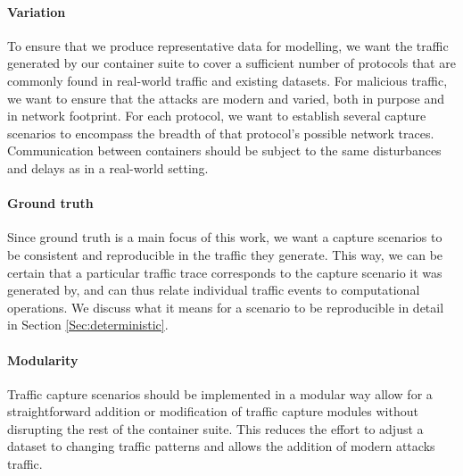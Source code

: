  \paragraph{Variation} To ensure that we produce representative data for modelling, we want the traffic generated by our container suite to cover a sufficient number of protocols that are commonly found in real-world traffic and existing datasets. For malicious traffic, we want to ensure that the attacks are modern and varied, both in purpose and in network footprint. For each protocol, we want to establish several capture scenarios to encompass the breadth of that protocol's possible network traces. Communication between containers should be subject to the same disturbances and delays as in a real-world setting.

 
 
\paragraph{Ground truth} Since ground truth is a main focus of this work, we want a capture scenarios to be consistent and reproducible in the traffic they generate. This way, we can be certain that a particular traffic trace corresponds to the capture scenario it was generated by, and can thus relate individual traffic events to computational operations. We discuss what it means for a scenario to be reproducible in detail in Section \ref{Sec:deterministic}. 

\paragraph{Modularity} Traffic capture scenarios should be implemented in a modular way allow for a straightforward addition or modification of traffic capture modules without disrupting the rest of the container suite. This reduces the effort to adjust a dataset to changing traffic patterns and allows the addition of modern attacks traffic.

